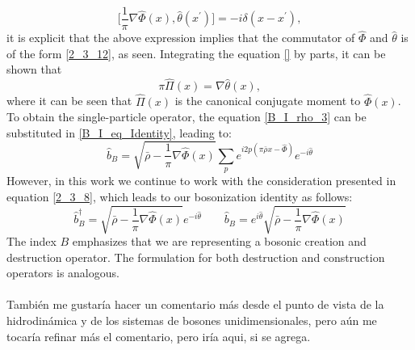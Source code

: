 \begin{equation} \label{2_3_12}
    \big[ \frac{1}{\pi} \nabla \hat{\Phi} (x),  \hat{\theta} (x^{\prime}) \big] = -i\delta (x-x^{\prime}),
\end{equation}
it is explicit that the above expression implies that the commutator of $\hat{\Phi}$ and $\hat{\theta}$ is of the form \ref{2_3_12}, as seen. Integrating the equation \ref{} by parts, it can be shown that
\begin{equation} \label{2_3_13}
    \pi \hat{\Pi} (x) = \nabla \hat{\theta} (x),
\end{equation}
where it can be seen that $\hat{\Pi}(x)$ is the canonical conjugate moment to $\hat{\Phi} (x)$. To obtain the single-particle operator, the equation \ref{B_I_rho_3} can be substituted in \ref{B_I_eq_Identity}, leading to:
\begin{equation} \label{2_3_14}
    \hat{b}_{B} = \sqrt{\bar{\rho} - \frac{1}{\pi} \nabla \hat{\Phi} (x)} \sum_{p} e^{i2p(\pi\bar{\rho}x - \hat{\Phi})} e^{-i\hat{\theta}}
\end{equation}
However, in this work we continue to work with the consideration presented in equation \ref{2_3_8}, which leads to our bosonization identity as follows:
\begin{equation} \label{2_3_15}
     \hat{b}_{B}^{\dagger} = \sqrt{\bar{\rho} - \frac{1}{\pi} \nabla \hat{\Phi} (x)}  e^{-i\hat{\theta}} \quad \quad  \hat{b}_{B} =  e^{i\hat{\theta}} \sqrt{\bar{\rho} - \frac{1}{\pi} \nabla \hat{\Phi} (x)}  
\end{equation}
The index $B$ emphasizes that we are representing a bosonic creation and destruction operator. The formulation for both destruction and construction operators is analogous. \\ \\
\textcolor{myred}{También me gustaría hacer un comentario más desde el punto de vista de la hidrodinámica y de los sistemas de bosones unidimensionales, pero aún me tocaría refinar más el comentario, pero iría aqui, si se agrega.}



\newpage

